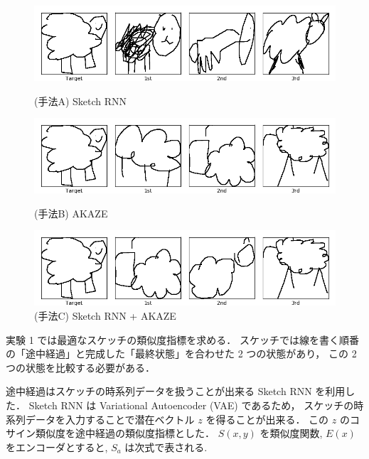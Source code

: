 \documentclass[twocolumn]{jarticle}     %
\begin{document}
\begin{figure}[tb]
 \begin{minipage}{1\hsize}
 	\begin{center}
 		\includegraphics[clip,width=120mm]{sketch_trained_sim_A_0.png}
 		\caption{(手法A) Sketch RNN}
 		\label{fig:exp1_a}
 	\end{center}
 \end{minipage}

  \begin{minipage}{1\hsize}
  	\begin{center}
  		\includegraphics[clip,width=120mm]{sketch_trained_sim_B_0.png}
  		\caption{(手法B) AKAZE}
  		\label{fig:exp1_b}
  	\end{center}
  \end{minipage}

   \begin{minipage}{1\hsize}
   	\begin{center}
   		\includegraphics[clip,width=120mm]{sketch_trained_sim_D_0.png}
   		\caption{(手法C) Sketch RNN + AKAZE}
   		\label{fig:exp1_c}
   	\end{center}
   \end{minipage}
\end{figure}

実験 1 では最適なスケッチの類似度指標を求める．
スケッチでは線を書く順番の「途中経過」と完成した「最終状態」を合わせた 2 つの状態があり，
この 2 つの状態を比較する必要がある．

途中経過はスケッチの時系列データを扱うことが出来る Sketch RNN を利用した．
Sketch RNN は Variational Autoencoder (VAE) であるため，
スケッチの時系列データを入力することで潜在ベクトル $z$ を得ることが出来る．
この $z$ のコサイン類似度を途中経過の類似度指標とした．
$S(x, y)$ を類似度関数, $E(x)$ をエンコーダとすると, $S_a$ は次式で表される.
\end{document}
